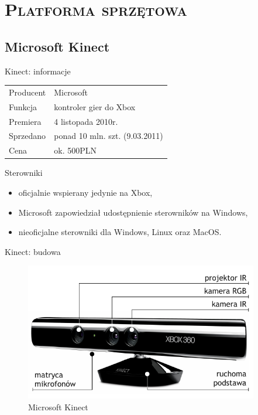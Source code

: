 \documentclass[xcolor=x11names,compress]{beamer}
\renewcommand{\(}{\begin{columns}}
\renewcommand{\)}{\end{columns}}
\newcommand{\<}[1]{\begin{column}{#1}}
\renewcommand{\>}{\end{column}}
\begin{document}
%
%
\section{\scshape Platforma sprzętowa}

\subsection{Microsoft Kinect}

\begin{frame}{Kinect: informacje}

    \begin{tabular}{ll}
    \alert{Producent} & Microsoft\\
    \alert{Funkcja} & kontroler gier do Xbox\\
    \alert{Premiera} & 4 listopada 2010r. \\
    \alert{Sprzedano} & ponad 10 mln. szt. (9.03.2011)\\
    \alert{Cena} & ok. 500PLN\\
    \end{tabular}

    \pause
    \vspace{1cm}

    \alert{Sterowniki}
    \begin{itemize}
    \item oficjalnie wspierany jedynie na Xbox,
    \item Microsoft zapowiedział udostępnienie sterowników na Windows,
    \item nieoficjalne sterowniki dla Windows, Linux oraz MacOS.
    \end{itemize}

\end{frame}


\begin{frame}{Kinect: budowa}

    \begin{figure}[h!]
    \centering
    \includegraphics[height=6cm]{../Common/img/kinect_hardware}
    \caption{Microsoft Kinect}
    \end{figure}

\end{frame}
\end{document}
